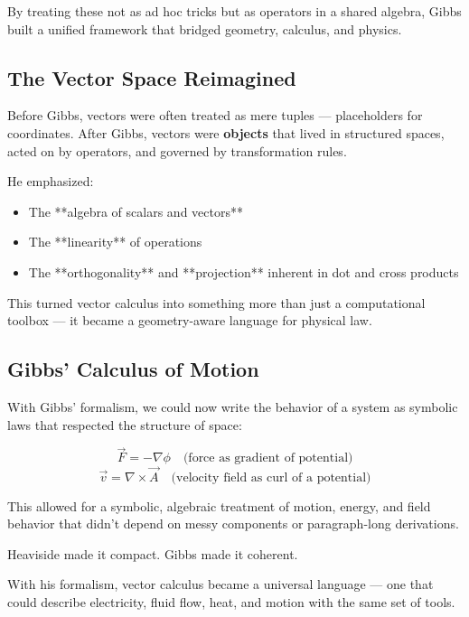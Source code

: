 By treating these not as ad hoc tricks but as operators in a shared algebra, Gibbs built a unified framework that bridged geometry, calculus, and physics.

\subsection{The Vector Space Reimagined}

Before Gibbs, vectors were often treated as mere tuples — placeholders for coordinates.  
After Gibbs, vectors were \textbf{objects} that lived in structured spaces, acted on by operators, and governed by transformation rules.

He emphasized:

\begin{itemize}
    \item The **algebra of scalars and vectors**
    \item The **linearity** of operations
    \item The **orthogonality** and **projection** inherent in dot and cross products
\end{itemize}

This turned vector calculus into something more than just a computational toolbox — it became a geometry-aware language for physical law.

\subsection{Gibbs’ Calculus of Motion}

With Gibbs’ formalism, we could now write the behavior of a system as symbolic laws that respected the structure of space:

\[
\vec{F} = -\nabla \phi \quad \text{(force as gradient of potential)}
\]
\[
\vec{v} = \nabla \times \vec{A} \quad \text{(velocity field as curl of a potential)}
\]

This allowed for a symbolic, algebraic treatment of motion, energy, and field behavior that didn’t depend on messy components or paragraph-long derivations.

\begin{tcolorbox}[colback=blue!5!white, colframe=blue!50!black, title={Gibbs’ Gift to Vector Calculus}]
Heaviside made it compact.  
Gibbs made it coherent.

With his formalism, vector calculus became a universal language —  
one that could describe electricity, fluid flow, heat, and motion  
with the same set of tools.
\end{tcolorbox}

